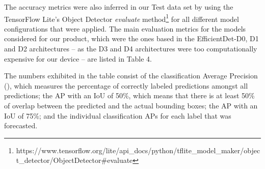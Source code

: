 The accuracy metrics were also inferred in our Test data set by using the TensorFlow Lite's 
Object Detector \textit{evaluate} method\footnote{https://www.tensorflow.org/lite/api\_docs/python/tflite\_model\_maker/object\_detector/ObjectDetector\#evaluate}
for all different model configurations that were applied. 
The main evaluation metrics for the models considered for our product, which were the ones based 
in the EfficientDet-D0, D1 and D2 architectures -- as the D3 and D4 architectures were too 
computationally expensive for our device -- are listed in Table 4. 

The numbers exhibited in the table consist of the classification Average Precision 
(), which measures the percentage of correctly labeled 
predictions amongst all predictions; the AP with an IoU of 50\%, which means that
there is at least 50\% of overlap between the predicted and the actual bounding boxes; 
the AP with an IoU of 75\%; and the individual classification APs for each label that 
was forecasted. 

